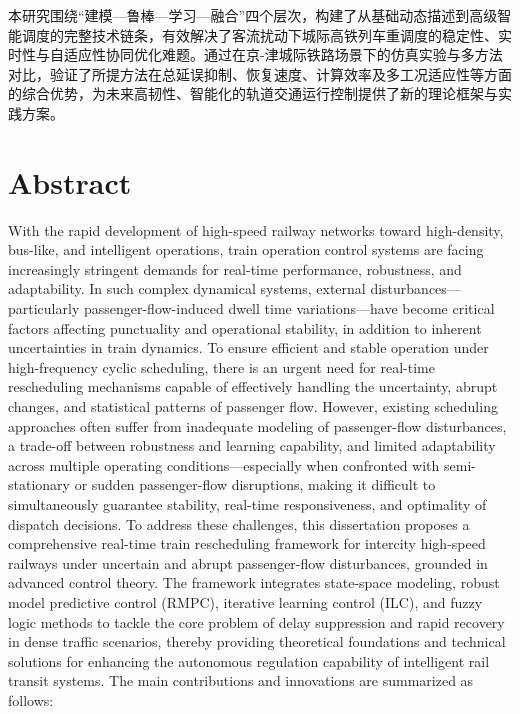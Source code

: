 本研究围绕“建模—鲁棒—学习—融合”四个层次，构建了从基础动态描述到高级智能调度的完整技术链条，有效解决了客流扰动下城际高铁列车重调度的稳定性、实时性与自适应性协同优化难题。通过在京-津城际铁路场景下的仿真实验与多方法对比，验证了所提方法在总延误抑制、恢复速度、计算效率及多工况适应性等方面的综合优势，为未来高韧性、智能化的轨道交通运行控制提供了新的理论框架与实践方案。





\chapter{Abstract}%


With the rapid development of high-speed railway networks toward high-density, bus-like, and intelligent operations, train operation control systems are facing increasingly stringent demands for real-time performance, robustness, and adaptability. In such complex dynamical systems, external disturbances—particularly passenger-flow-induced dwell time variations—have become critical factors affecting punctuality and operational stability, in addition to inherent uncertainties in train dynamics. To ensure efficient and stable operation under high-frequency cyclic scheduling, there is an urgent need for real-time rescheduling mechanisms capable of effectively handling the uncertainty, abrupt changes, and statistical patterns of passenger flow. However, existing scheduling approaches often suffer from inadequate modeling of passenger-flow disturbances, a trade-off between robustness and learning capability, and limited adaptability across multiple operating conditions—especially when confronted with semi-stationary or sudden passenger-flow disruptions, making it difficult to simultaneously guarantee stability, real-time responsiveness, and optimality of dispatch decisions.
To address these challenges, this dissertation proposes a comprehensive real-time train rescheduling framework for intercity high-speed railways under uncertain and abrupt passenger-flow disturbances, grounded in advanced control theory. The framework integrates state-space modeling, robust model predictive control (RMPC), iterative learning control (ILC), and fuzzy logic methods to tackle the core problem of delay suppression and rapid recovery in dense traffic scenarios, thereby providing theoretical foundations and technical solutions for enhancing the autonomous regulation capability of intelligent rail transit systems. The main contributions and innovations are summarized as follows:

